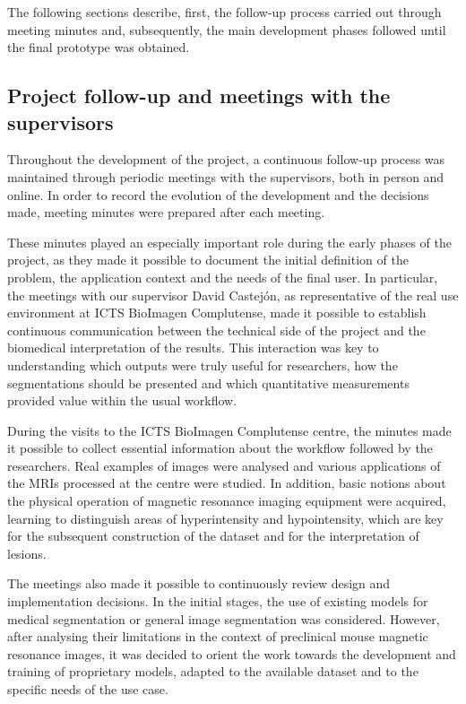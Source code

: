 The following sections describe, first, the follow-up process carried out through meeting minutes and, subsequently, the main development phases followed until the final prototype was obtained.

\subsection*{Project follow-up and meetings with the supervisors}

Throughout the development of the project, a continuous follow-up process was maintained through periodic meetings with the supervisors, both in person and online. In order to record the evolution of the development and the decisions made, meeting minutes were prepared after each meeting.

These minutes played an especially important role during the early phases of the project, as they made it possible to document the initial definition of the problem, the application context and the needs of the final user. In particular, the meetings with our supervisor David Castejón, as representative of the real use environment at ICTS BioImagen Complutense, made it possible to establish continuous communication between the technical side of the project and the biomedical interpretation of the results. This interaction was key to understanding which outputs were truly useful for researchers, how the segmentations should be presented and which quantitative measurements provided value within the usual workflow.

During the visits to the ICTS BioImagen Complutense centre, the minutes made it possible to collect essential information about the workflow followed by the researchers. Real examples of images were analysed and various applications of the MRIs processed at the centre were studied. In addition, basic notions about the physical operation of magnetic resonance imaging equipment were acquired, learning to distinguish areas of hyperintensity and hypointensity, which are key for the subsequent construction of the dataset and for the interpretation of lesions.

The meetings also made it possible to continuously review design and implementation decisions. In the initial stages, the use of existing models for medical segmentation or general image segmentation was considered. However, after analysing their limitations in the context of preclinical mouse magnetic resonance images, it was decided to orient the work towards the development and training of proprietary models, adapted to the available dataset and to the specific needs of the use case.

